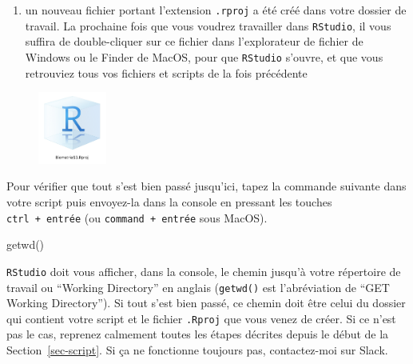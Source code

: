 \documentclass[
  letterpaper,
  DIV=11,
  numbers=noendperiod]{scrreprt}
\newenvironment{Shaded}{\begin{snugshade}}{\end{snugshade}}
\newcommand{\FunctionTok}[1]{\textcolor[rgb]{0.28,0.35,0.67}{#1}}
\newcommand{\NormalTok}[1]{\textcolor[rgb]{0.00,0.23,0.31}{#1}}
\providecommand{\tightlist}{%
  \setlength{\itemsep}{0pt}\setlength{\parskip}{0pt}}\usepackage{longtable,booktabs,array}
\begin{document}
\begin{enumerate}
\def\labelenumi{\arabic{enumi}.}
\setcounter{enumi}{2}
\tightlist
\item
  un nouveau fichier portant l'extension \texttt{.rproj} a été créé dans
  votre dossier de travail. La prochaine fois que vous voudrez
  travailler dans \texttt{RStudio}, il vous suffira de double-cliquer
  sur ce fichier dans l'explorateur de fichier de Windows ou le Finder
  de MacOS, pour que \texttt{RStudio} s'ouvre, et que vous retrouviez
  tous vos fichiers et scripts de la fois précédente
\end{enumerate}

\begin{figure}

{\centering \includegraphics[width=0.2\textwidth,height=\textheight]{./images/Rproj3.png}

}

\end{figure}

Pour vérifier que tout s'est bien passé jusqu'ici, tapez la commande
suivante dans votre script puis envoyez-la dans la console en pressant
les touches \texttt{ctrl\ +\ entrée} (ou \texttt{command\ +\ entrée}
sous MacOS).

\begin{Shaded}
\begin{Highlighting}[]
\FunctionTok{getwd}\NormalTok{()}
\end{Highlighting}
\end{Shaded}

\texttt{RStudio} doit vous afficher, dans la console, le chemin jusqu'à
votre {répertoire de travail} ou ``Working Directory'' en anglais
(\texttt{getwd()} est l'abréviation de ``GET Working Directory''). Si
tout s'est bien passé, ce chemin doit être celui du dossier qui contient
votre script et le fichier \texttt{.Rproj} que vous venez de créer. Si
ce n'est pas le cas, reprenez calmement toutes les étapes décrites
depuis le début de la Section~\ref{sec-script}. Si ça ne fonctionne
toujours pas, contactez-moi sur Slack.
\end{document}
